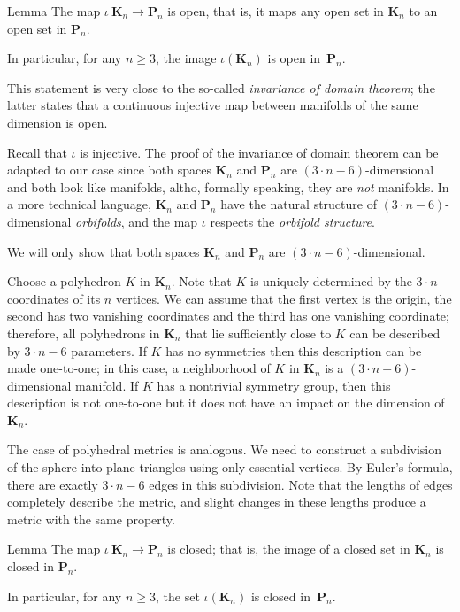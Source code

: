 \begin{thm}{Lemma}
The map $\iota\:\mathbf{K}_n\to\mathbf{P}_n$ is open, 
that is, it maps any open set in $\mathbf{K}_n$ to an open set in $\mathbf{P}_n$.

In particular, for any $n\ge 3$, the image $\iota(\mathbf{K}_n)$ is open in~$\mathbf{P}_n$.
\end{thm}

This statement is very close to the so-called \emph{invariance of domain theorem};
the latter states that a continuous injective map between manifolds of the same dimension is open.

Recall that $\iota$ is injective.
The proof of the invariance of domain theorem can be adapted to our case since both spaces $\mathbf{K}_n$ and $\mathbf{P}_n$ are $(3\cdot n-6)$-dimensional and both look like manifolds, altho, formally speaking, they are \emph{not} manifolds.
In a more technical language, $\mathbf{K}_n$ and $\mathbf{P}_n$ have the natural structure of $(3\cdot n-6)$-dimensional \emph{orbifolds},
and the map $\iota$ respects the \emph{orbifold structure}.

We will only show that both spaces $\mathbf{K}_n$ and $\mathbf{P}_n$ are $(3\cdot n-6)$-dimensional.

Choose a polyhedron $K$ in $\mathbf{K}_n$.
Note that $K$ is uniquely determined by the $3\cdot n$ coordinates of its $n$ vertices.
We can assume that the first vertex is the origin, the second has two vanishing coordinates and the third has one vanishing coordinate; therefore, all polyhedrons in $\mathbf{K}_n$ that lie sufficiently close to $K$ can be described by $3\cdot n-6$ parameters.
If $K$ has no symmetries then this description can be made one-to-one;
in this case, a neighborhood of $K$ in $\mathbf{K}_n$ is a $(3\cdot n-6)$-dimensional manifold.
If $K$ has a nontrivial symmetry group, then this description is not one-to-one but it does not have an impact on the dimension of $\mathbf{K}_n$.

The case of polyhedral metrics is analogous.
We need to construct a subdivision of the sphere into plane triangles using only essential vertices.
By Euler's formula, there are exactly $3\cdot n-6$ edges in this subdivision.
Note that the lengths of edges completely describe the metric, and slight changes in these lengths produce a metric with the same property.

\begin{thm}{Lemma}
The map $\iota\:\mathbf{K}_n\to\mathbf{P}_n$ is closed;
that is, the image of a closed set in $\mathbf{K}_n$ is closed in $\mathbf{P}_n$.

In particular, for any $n\ge 3$, the set $\iota(\mathbf{K}_n)$ is closed in~$\mathbf{P}_n$.
\end{thm}

